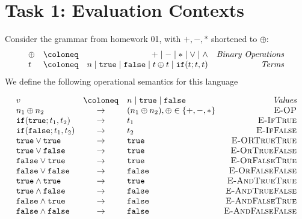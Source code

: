 \section*{Task 1: Evaluation Contexts}
Consider the grammar from homework 01, with $+,-,*$ shortened to $\oplus$:
\[
  \begin{array}{l c r r}
    \oplus & \coloneq & + \mid - \mid * \mid \vee \mid \wedge & \emph{Binary Operations}\\
    t & \coloneq & n \mid \mathtt{true} \mid \mathtt{false} \mid t \oplus t  \mid \mathtt{if}(t;t,t) & \emph{Terms}\\
  \end{array}
\]
We define the following operational semantics for this language

\[
\begin{array}{lclr}
  v & \coloneq & n \mid \mathtt{true} \mid \mathtt{false} & \emph{Values}\\
  n_1 \oplus n_2 & \rightarrow & (n_1\oplus n_2), \oplus \in \{+,-,*\} & \textsc{E-OP} \\
  \mathtt{if}(\texttt{true};t_1,t_2) & \rightarrow & t_1 & \textsc{E-IfTrue} \\
  \mathtt{if}(\texttt{false};t_1,t_2) & \rightarrow & t_2 & \textsc{E-IfFalse}\\
  \mathtt{true} \vee \mathtt{true} & \rightarrow & \mathtt{true} & \textsc{E-ORTrueTrue}\\
  \mathtt{true} \vee \mathtt{false} & \rightarrow & \mathtt{true} & \textsc{E-OrTrueFalse}\\
  \mathtt{false} \vee \mathtt{true} & \rightarrow & \mathtt{true} & \textsc{E-OrFalseTrue}\\ 
  \mathtt{false} \vee \mathtt{false} &\rightarrow & \mathtt{false} & \textsc{E-OrFalseFalse}\\ 
  \mathtt{true} \wedge \mathtt{true} & \rightarrow & \mathtt{true} & \textsc{E-AndTrueTrue}\\
  \mathtt{true} \wedge \mathtt{false} & \rightarrow & \mathtt{false} & \textsc{E-AndTrueFalse}\\
  \mathtt{false} \wedge \mathtt{true} & \rightarrow & \mathtt{false} & \textsc{E-AndFalseTrue}\\
  \mathtt{false} \wedge \mathtt{false} & \rightarrow & \mathtt{false} & \textsc{E-AndFalseFalse} 
\end{array}
\]

